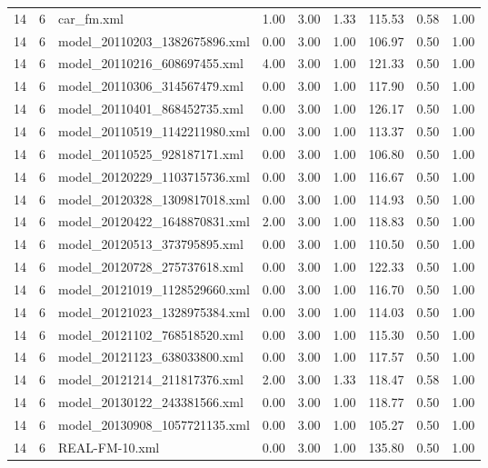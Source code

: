 \begin{table}[ht]
\begin{tabular}{rrlrrrrrr}
   14 &   6 & car\_fm.xml & 1.00 & 3.00 & 1.33 & 115.53 & 0.58 & 1.00 \\ 
   14 &   6 & model\_20110203\_1382675896.xml & 0.00 & 3.00 & 1.00 & 106.97 & 0.50 & 1.00 \\ 
   14 &   6 & model\_20110216\_608697455.xml & 4.00 & 3.00 & 1.00 & 121.33 & 0.50 & 1.00 \\ 
   14 &   6 & model\_20110306\_314567479.xml & 0.00 & 3.00 & 1.00 & 117.90 & 0.50 & 1.00 \\ 
   14 &   6 & model\_20110401\_868452735.xml & 0.00 & 3.00 & 1.00 & 126.17 & 0.50 & 1.00 \\ 
   14 &   6 & model\_20110519\_1142211980.xml & 0.00 & 3.00 & 1.00 & 113.37 & 0.50 & 1.00 \\ 
   14 &   6 & model\_20110525\_928187171.xml & 0.00 & 3.00 & 1.00 & 106.80 & 0.50 & 1.00 \\ 
   14 &   6 & model\_20120229\_1103715736.xml & 0.00 & 3.00 & 1.00 & 116.67 & 0.50 & 1.00 \\ 
   14 &   6 & model\_20120328\_1309817018.xml & 0.00 & 3.00 & 1.00 & 114.93 & 0.50 & 1.00 \\ 
   14 &   6 & model\_20120422\_1648870831.xml & 2.00 & 3.00 & 1.00 & 118.83 & 0.50 & 1.00 \\ 
   14 &   6 & model\_20120513\_373795895.xml & 0.00 & 3.00 & 1.00 & 110.50 & 0.50 & 1.00 \\ 
   14 &   6 & model\_20120728\_275737618.xml & 0.00 & 3.00 & 1.00 & 122.33 & 0.50 & 1.00 \\ 
   14 &   6 & model\_20121019\_1128529660.xml & 0.00 & 3.00 & 1.00 & 116.70 & 0.50 & 1.00 \\ 
   14 &   6 & model\_20121023\_1328975384.xml & 0.00 & 3.00 & 1.00 & 114.03 & 0.50 & 1.00 \\ 
   14 &   6 & model\_20121102\_768518520.xml & 0.00 & 3.00 & 1.00 & 115.30 & 0.50 & 1.00 \\ 
   14 &   6 & model\_20121123\_638033800.xml & 0.00 & 3.00 & 1.00 & 117.57 & 0.50 & 1.00 \\ 
   14 &   6 & model\_20121214\_211817376.xml & 2.00 & 3.00 & 1.33 & 118.47 & 0.58 & 1.00 \\ 
   14 &   6 & model\_20130122\_243381566.xml & 0.00 & 3.00 & 1.00 & 118.77 & 0.50 & 1.00 \\ 
   14 &   6 & model\_20130908\_1057721135.xml & 0.00 & 3.00 & 1.00 & 105.27 & 0.50 & 1.00 \\ 
   14 &   6 & REAL-FM-10.xml & 0.00 & 3.00 & 1.00 & 135.80 & 0.50 & 1.00 \\ 

\end{tabular}
\end{table}
